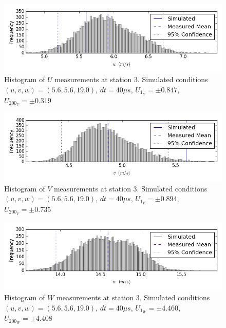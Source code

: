 \begin{figure}[H]
\centering
\includegraphics[width=6in]{figs/Ely_May28th03002/uncertainty_Ely_May28th03002_U}
\caption{Histogram of $U$ measurements at station 3. Simulated conditions $(u,v,w)=(5.6, 5.6, 19.0)$, $dt=40 \mu s$, $U_1_U=\pm 0.847$, $U_200_U=\pm 0.319$}
\label{fig:uncertainty_Ely_May28th03002_U}
\end{figure}


\begin{figure}[H]
\centering
\includegraphics[width=6in]{figs/Ely_May28th03002/uncertainty_Ely_May28th03002_V}
\caption{Histogram of $V$ measurements at station 3. Simulated conditions $(u,v,w)=(5.6, 5.6, 19.0)$, $dt=40 \mu s$, $U_1_V=\pm 0.894$, $U_200_V=\pm 0.735$}
\label{fig:uncertainty_Ely_May28th03002_V}
\end{figure}


\begin{figure}[H]
\centering
\includegraphics[width=6in]{figs/Ely_May28th03002/uncertainty_Ely_May28th03002_W}
\caption{Histogram of $W$ measurements at station 3. Simulated conditions $(u,v,w)=(5.6, 5.6, 19.0)$, $dt=40 \mu s$, $U_1_W=\pm 4.460$, $U_200_W=\pm 4.408$}
\label{fig:uncertainty_Ely_May28th03002_W}
\end{figure}



